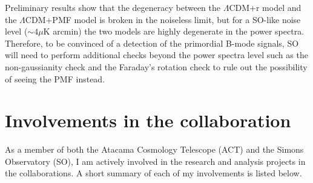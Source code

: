 \documentclass[12pt, notitlepage, onecolumn, amsmath, amssymb, aps]{revtex4-1}
\begin{document}
Preliminary results show that the degeneracy between the
$\Lambda$CDM+r model and the $\Lambda$CDM+PMF model is broken in the
noiseless limit, but for a SO-like noise level ($\sim 4\mu$K arcmin)
the two models are highly degenerate in the power spectra. Therefore,
to be convinced of a detection of the primordial B-mode signals, SO
will need to perform additional checks beyond the power spectra level
such as the non-gaussianity check \cite{Lewis:2004ef} and the
Faraday's rotation check \cite{Kosowsky:1996yc} to rule out the
possibility of seeing the PMF instead.




\section{Involvements in the collaboration}
\label{sec:org093d799}
As a member of both the Atacama Cosmology Telescope (ACT) and the
Simons Observatory (SO), I am actively involved in the research and
analysis projects in the collaborations. A short summary of each of my
involvements is listed below.
\end{document}
